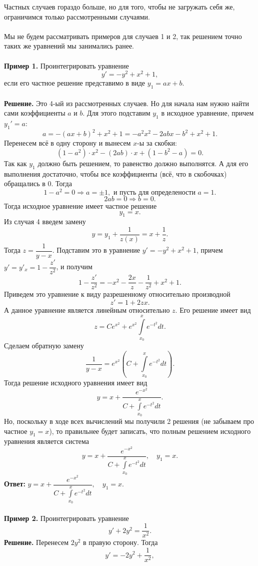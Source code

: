 \documentclass[a4paper, 12pt]{article}
\begin{document}
	Частных случаев гораздо больше, но для того, чтобы не загружать себя же, ограничимся только рассмотренными случаями.\\\\
	Мы не будем рассматривать примеров для случаев 1 и 2, так решением точно таких же уравнений мы занимались ранее.\\\\
	\textbf{Пример 1.} Проинтегрировать уравнение $$y' = -y^2 + x^2 + 1,$$
	если его частное решение представимо в виде $y_1 = ax + b$.\\\\
	\textbf{Решение.} Это 4-ый из рассмотренных случаев. Но для начала нам нужно найти сами коэффициенты $a$ и $b$. Для этого подставим $y_1$ в исходное уравнение, причем $y_1' = a$:
	$$a = -(ax + b)^2 + x^2 + 1 = -a^2x^2 - 2abx - b^2 + x^2 + 1.$$
	Перенесем всё в одну сторону и вынесем $x$-ы за скобки:
	$$(1-a^2)\cdot x^2 - (2ab)\cdot x + (1-b^2-a) = 0.$$
	Так как $y_1$ должно быть решением, то равенство должно выполнятся. А для его выполнения достаточно, чтобы все коэффициенты (всё, что в скобочках) обращались в 0. Тогда $$1 - a^2 = 0\Rightarrow a = \pm 1,\text{ и пусть для определености } a = 1.$$
	$$2ab = 0\Rightarrow b = 0.$$
	Тогда исходное уравнение имеет частное решение $$y_1 = x.$$
	Из случая 4 введем замену $$y = y_1 + \dfrac{1}{z(x)} = x + \dfrac{1}{z}.$$
	Тогда $z = \dfrac{1}{y - x}$.
	Подставим это в уравнение $y' = -y^2 + x^2 + 1$, причем $y' = y'_x = 1 -\dfrac{z'}{z^2}$, и получим
	$$1 - \dfrac{z'}{z^2} = -x^2 - \dfrac{2x}{z} - \dfrac{1}{z^2} + x^2 + 1.$$
	Приведем это уравнение к виду разрешенному относительно производной $$z' = 1 + 2zx.$$
	А данное уравнение является линейным относительно $z$. Его решение имеет вид $$z=Ce^{x^2} + e^{x^2}\int\limits_{x_0}^xe^{-t^2}dt.$$
	Сделаем обратную замену $$\dfrac{1}{y - x} =e^{x^2} (C + \int\limits_{x_0}^xe^{-t^2}dt).$$
	Тогда решение исходного уравнения имеет вид $$y = x + \dfrac{e^{-x^2}}{C + \int\limits_{x_0}^xe^{-t^2}dt}.$$
	Но, поскольку в ходе всех вычислений мы получили 2 решения (не забываем про частное $y_1 = x$), то правильнее будет записать, что полным решением исходного уравнения является система $$y = x + \dfrac{e^{-x^2}}{C + \int\limits_{x_0}^xe^{-t^2}dt},\quad y_1 = x.$$
	\textbf{Ответ:} $y = x + \dfrac{e^{-x^2}}{C + \int\limits_{x_0}^xe^{-t^2}dt},\quad y_1 = x.$\\\\
	\textbf{Пример 2.} Проинтегрировать уравнение $$y' + 2y^2 = \dfrac{1}{x^2}.$$
	\textbf{Решение.} Перенесем $2y^2$ в правую сторону. Тогда $$y' = -2y^2 + \dfrac{1}{x^2},$$
\end{document}
